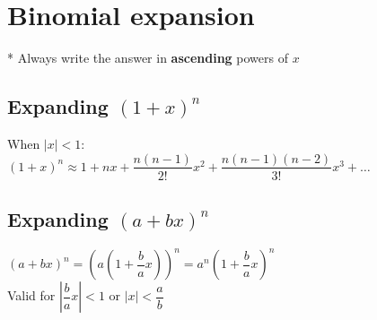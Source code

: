 \section{Binomial expansion}
* Always write the answer in \textbf{ascending} powers of $x$
\subsection{Expanding $(1+x)^n$}
When $|x|<1$:\\
$(1+x)^n\approx 1 + nx + \dfrac{n(n-1)}{2!}x^2+\dfrac{n(n-1)(n-2)}{3!}x^3+\dots$
\subsection{Expanding $(a+bx)^n$}
$(a+bx)^n = \left(a(1+\dfrac{b}{a}x)\right)^n = a^n(1+\dfrac{b}{a}x)^n$\\
Valid for $\left|\dfrac{b}{a}x\right|<1$ or $|x| < \dfrac{a}{b}$